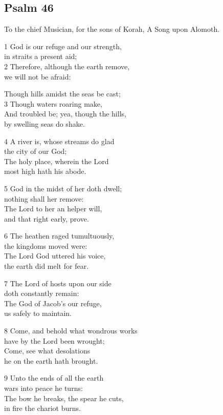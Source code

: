 \begin{multicols}{3}
\subsection*{Psalm 46}

To the chief Musician, for the sons of Korah,
A Song upon Alomoth.

1 God is our refuge and our strength,\\
in straits a present aid;\\
2 Therefore, although the earth remove,\\
we will not be afraid:

Though hills amidst the seas be cast;\\
3 Though waters roaring make,\\
And troubled be; yea, though the hills,\\
by swelling seas do shake.

4 A river is, whose streams do glad\\
the city of our God;\\
The holy place, wherein the Lord\\
most high hath his abode.

5 God in the midst of her doth dwell;\\
nothing shall her remove:\\
The Lord to her an helper will,\\
and that right early, prove.

6 The heathen raged tumultuously,\\
the kingdoms moved were:\\
The Lord God uttered his voice,\\
the earth did melt for fear.

7 The Lord of hosts upon our side\\
doth constantly remain:\\
The God of Jacob’s our refuge,\\
us safely to maintain.

8 Come, and behold what wondrous works\\
have by the Lord been wrought;\\
Come, see what desolations\\
he on the earth hath brought.

9 Unto the ends of all the earth\\
wars into peace he turns:\\
The bow he breaks, the spear he cuts,\\
in fire the chariot burns.


\end{multicols}
